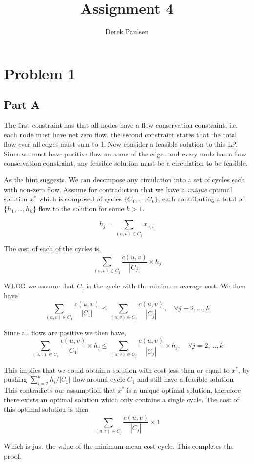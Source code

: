 \documentclass[a4paper]{article}
\title{Assignment 4} %
\author{
Derek Paulsen \\
}
\date{}
\begin{document}
\maketitle 

\section{Problem 1}
\subsection{Part A}
The first constraint has that all nodes
have a flow conservation constraint, i.e. each node must have net zero flow. 
the second constraint states that the total flow over all edges must sum to 1. 
Now consider a feasible solution to this LP. Since we must have positive flow 
on some of the edges and every node has a flow conservation constraint, any feasible 
solution must be a circulation to be feasible. 

As the hint suggests. We can decompose any circulation into a set of cycles each with non-zero flow. 
Assume for contradiction that we have a \textit{unique} optimal solution $x^*$ which is composed of 
cycles $\{C_1, ..., C_k\}$, each contributing a total of $\{h_1, ..., h_k\}$ flow to the solution for some $k > 1$.

$$
h_j = \sum_{(u,v)\in C_j} x_{u,v}
$$ 

The cost of each of the cycles is,
$$
\sum_{(u,v)\in C_j} \frac{c(u,v)}{ |C_j| } \times h_j
$$

WLOG we assume that $C_1$ is the cycle with the minimum average cost. We then have 
$$
\sum_{(u,v)\in C_1} \frac{c(u,v)}{ |C_1| } \leq  \sum_{(u,v)\in C_j} \frac{c(u,v)}{ |C_j| }, \quad \forall j=2,...,k
$$

Since all flows are positive we then have, 
$$
\sum_{(u,v)\in C_1} \frac{c(u,v)}{ |C_1| } \times h_j \leq  \sum_{(u,v)\in C_j} \frac{c(u,v)}{ |C_j| } \times h_j , \quad \forall j=2,...,k
$$


This implies that we could obtain a solution with cost less than or equal to $x^*$, 
by pushing $\sum_{i=2}^k h_i / |C_1|$ flow around cycle $C_1$ and still have a 
feasible solution. This contradicts our assumption that $x^*$ is a unique optimal 
solution, therefore there exists an optimal solution which only contains a single cycle. 
The cost of this optimal solution is then 
$$
\sum_{(u,v)\in C_j} \frac{c(u,v)}{ |C_j| } \times 1
$$

Which is just the value of the minimum mean cost cycle. This completes the proof.
\end{document}
